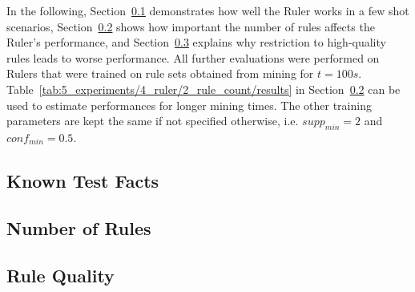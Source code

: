 In the following, Section~\ref{subsec:5_experiments/4_ruler/1_known} demonstrates how well the Ruler works in a few shot scenarios, Section~\ref{subsec:5_experiments/4_ruler/2_rule_count} shows how important the number of rules affects the Ruler's performance, and Section~\ref{subsec:5_experiments/4_ruler/3_rule_quality} explains why restriction to high-quality rules leads to worse performance. All further evaluations were performed on Rulers that were trained on rule sets obtained from mining for $t = 100s$. Table~\ref{tab:5_experiments/4_ruler/2_rule_count/results} in Section~\ref{subsec:5_experiments/4_ruler/2_rule_count} can be used to estimate performances for longer mining times. The other training parameters are kept the same if not specified otherwise, i.e. $supp_{min} = 2$ and $conf_{min} = 0.5$.

\subsection{Known Test Facts}
\label{subsec:5_experiments/4_ruler/1_known}


\subsection{Number of Rules}
\label{subsec:5_experiments/4_ruler/2_rule_count}


\subsection{Rule Quality}
\label{subsec:5_experiments/4_ruler/3_rule_quality}

